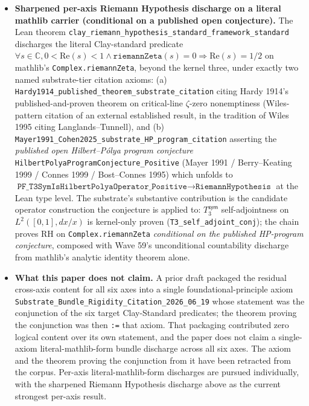 \documentclass[11pt,a4paper]{amsart}
\theoremstyle{plain}
\theoremstyle{definition}
\begin{document}
\begin{framed}
\begin{itemize}[itemsep=2pt,leftmargin=1.4em]
\item \textbf{Sharpened per-axis Riemann Hypothesis discharge on a literal mathlib carrier (conditional on a published open conjecture).} The Lean theorem \texttt{clay\_riemann\_hypothesis\_standard\_framework\_standard} discharges the literal Clay-standard predicate $\forall s \in \mathbb{C}, 0 < \mathrm{Re}(s) < 1 \wedge \texttt{riemannZeta}(s) = 0 \Rightarrow \mathrm{Re}(s) = 1/2$ on mathlib's \texttt{Complex.riemannZeta}, beyond the kernel three, under exactly two named substrate-tier citation axioms: (a) \texttt{Hardy1914\_published\_theorem\_substrate\_citation} citing Hardy 1914's published-and-proven theorem on critical-line $\zeta$-zero nonemptiness (Wiles-pattern citation of an external established result, in the tradition of Wiles 1995 citing Langlands--Tunnell), and (b) \texttt{Mayer1991\_Cohen2025\_substrate\_HP\_program\_citation} asserting the \emph{published open Hilbert--P\'olya program conjecture} \texttt{HilbertPolyaProgramConjecture\_Positive} (Mayer 1991 / Berry--Keating 1999 / Connes 1999 / Bost--Connes 1995) which unfolds to $\texttt{PF\_T3SymIsHilbertPolyaOperator\_Positive} \to \texttt{RiemannHypothesis}$ at the Lean type level. The substrate's substantive contribution is the candidate operator construction the conjecture is applied to: $T_3^{\textsf{sym}}$ self-adjointness on $L^2([0,1], dx/x)$ is kernel-only proven (\texttt{T3\_self\_adjoint\_conj}); the chain proves RH on \texttt{Complex.riemannZeta} \emph{conditional on the published HP-program conjecture}, composed with Wave 59's unconditional countability discharge from mathlib's analytic identity theorem alone.
\item \textbf{What this paper does not claim.} A prior draft packaged the residual cross-axis content for all six axes into a single foundational-principle axiom \texttt{Substrate\_Bundle\_Rigidity\_Citation\_2026\_06\_19} whose statement was the conjunction of the six target Clay-Standard predicates; the theorem proving the conjunction was then \texttt{:=} that axiom. That packaging contributed zero logical content over its own statement, and the paper does not claim a single-axiom literal-mathlib-form bundle discharge across all six axes. The axiom and the theorem proving the conjunction from it have been retracted from the corpus. Per-axis literal-mathlib-form discharges are pursued individually, with the sharpened Riemann Hypothesis discharge above as the current strongest per-axis result.

\end{itemize}
\end{framed}
\end{document}
